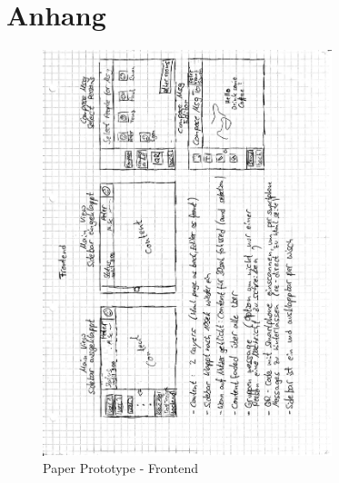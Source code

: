 \chapter*{Anhang}\label{Anhang}
\label{paperPrototype}
\begin{figure}[h!]
  \centering
    \includegraphics[width=0.75\textwidth]{./img/paperPrototype1.png}
  \caption{Paper Prototype - Frontend}
  \label{img:paperPrototypeFrontend}
\end{figure}

